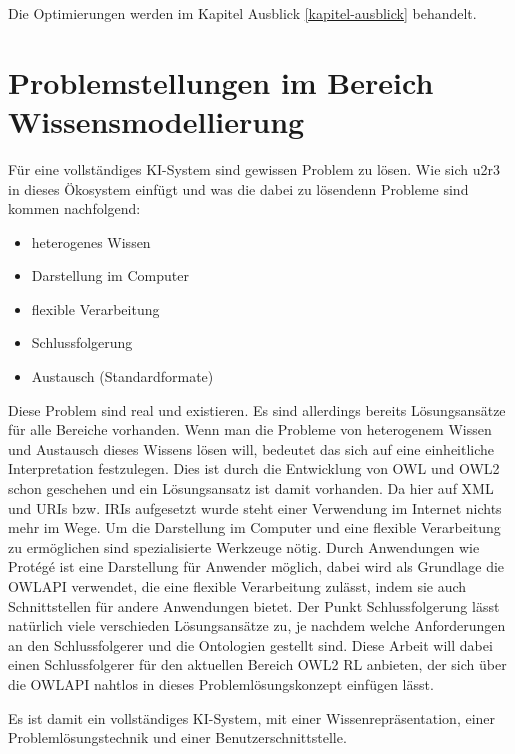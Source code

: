 Die Optimierungen werden im Kapitel Ausblick \ref{kapitel-ausblick} behandelt.

\section{Problemstellungen im Bereich Wissensmodellierung}
Für eine vollständiges KI-System sind gewissen Problem zu lösen. Wie sich u2r3 in dieses Ökosystem einfügt und was die dabei zu lösendenn Probleme sind kommen nachfolgend:

\begin{itemize}
  \item heterogenes Wissen
  \item Darstellung im Computer
  \item flexible Verarbeitung
  \item Schlussfolgerung
  \item Austausch (Standardformate)
\end{itemize}

Diese Problem sind real und existieren. Es sind allerdings bereits Lösungsansätze für alle Bereiche vorhanden. Wenn man die Probleme von heterogenem Wissen und Austausch dieses Wissens lösen will, bedeutet das sich auf eine einheitliche Interpretation festzulegen. Dies ist durch die Entwicklung von OWL und OWL2 schon geschehen und ein Lösungsansatz ist damit vorhanden. Da hier auf XML und URIs bzw. IRIs aufgesetzt wurde steht einer Verwendung im Internet nichts mehr im Wege. Um die Darstellung im Computer und eine flexible Verarbeitung zu ermöglichen sind spezialisierte Werkzeuge nötig. Durch Anwendungen wie Protégé ist eine Darstellung für Anwender möglich, dabei wird als Grundlage die OWLAPI verwendet, die eine flexible Verarbeitung zulässt, indem sie auch Schnittstellen für andere Anwendungen bietet. Der Punkt Schlussfolgerung lässt natürlich viele verschieden Lösungsansätze zu, je nachdem welche Anforderungen an den Schlussfolgerer und die Ontologien gestellt sind. Diese Arbeit will dabei einen Schlussfolgerer für den aktuellen Bereich OWL2 RL anbieten, der sich über die OWLAPI nahtlos in dieses Problemlösungskonzept einfügen lässt.

Es ist damit ein vollständiges KI-System, mit einer Wissenrepräsentation, einer Problemlösungstechnik und einer Benutzerschnittstelle.

